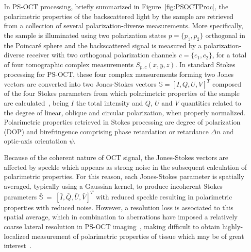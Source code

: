 In PS-OCT processing, briefly summarized in Figure~\ref{fig:PSOCTProc}, the polarimetric properties of the backscattered light by the sample are retrieved from a collection of several polarization-diverse measurements. More specifically, the sample is illuminated using two polarization states $p=\{p_1, p_2\}$ orthogonal in the Poincar\'e sphere and the backscattered signal is measured by a polarization-diverse receiver with two orthogonal polarization channels $c=\{c_1, c_2\}$, for a total of four tomographic complex measurements $S_{p,c}(x,y,z)$. In standard Stokes processing for PS-OCT, these four complex measurements forming two Jones vectors are converted into two Jones-Stokes vectors $\mathbf{\mathbb{S}} = [I, Q, U, V]^T$ composed of the four Stokes parameters from which polarimetric properties of the sample are calculated~\cite{deBoer2017_Polarization}, being $I$ the total intensity and $Q$, $U$ and $V$ quantities related to the degree of linear, oblique and circular polarization, when properly normalized. Polarimetric properties retrieved in Stokes processing are degree of polarization (DOP) and birefringence comprising phase retardation or retardance $\Delta n$ and optic-axis orientation $\psi$. 


Because of the coherent nature of OCT signal, the Jones-Stokes vectors are affected by speckle which appears as strong noise in the subsequent calculation of polarimetric properties. For this reason, each Jones-Stokes parameter is spatially averaged, typically using a Gaussian kernel, to produce incoherent Stokes parameters $\mathbf{\bar{\mathbb{S}}}~=~[\bar{I}, \bar{Q}, \bar{U}, \bar{V}]^T$ with reduced speckle resulting in polarimetric properties with reduced noise. However, a resolution loss is associated to this spatial average, which in combination to aberrations have imposed a relatively coarse lateral resolution in PS-OCT imaging~\cite{Cense2009_Retinal}, making difficult to obtain highly-localized measurement of polarimetric properties of tissue which may be of great interest~\cite{Cense2009_Retinal, Li2020_Vectorial}.

